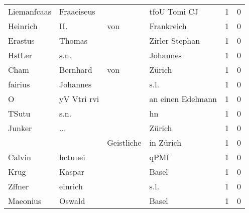 \documentclass[10pt,a4paper,landscape]{article}
\begin{document}
\begin{longtable}{llllrr}
              Liemanfcaas &                         Fraaeiseus &             &                                tfoU Tomi CJ &          1 &         0 \\
                 Heinrich &                                II. &         von &                                  Frankreich &          1 &         0 \\
                  Erastus &                             Thomas &             &                              Zirler Stephan &          1 &         0 \\
                   HstLer &                               s.n. &             &                                    Johannes &          1 &         0 \\
                     Cham &                           Bernhard &         von &                                      Zürich &          1 &         0 \\
                  fairius &                           Johannes &             &                                        s.l. &          1 &         0 \\
                        O &                        yV Vtri rvi &             &                           an einen Edelmann &          1 &         0 \\
                    TSutu &                               s.n. &             &                                          hn &          1 &         0 \\
                   Junker &                                ... &             &                                      Zürich &          1 &         0 \\
                          &                                    &  Geistliche &                                   in Zürich &          1 &         0 \\
                   Calvin &                            hctuuei &             &                                        qPMf &          1 &         0 \\
                     Krug &                             Kaspar &             &                                       Basel &          1 &         0 \\
                   Zffner &                            einrich &             &                                        s.l. &          1 &         0 \\
                 Maeonius &                             Oswald &             &                                       Basel &          1 &         0 \\

\end{longtable}
\end{document}
